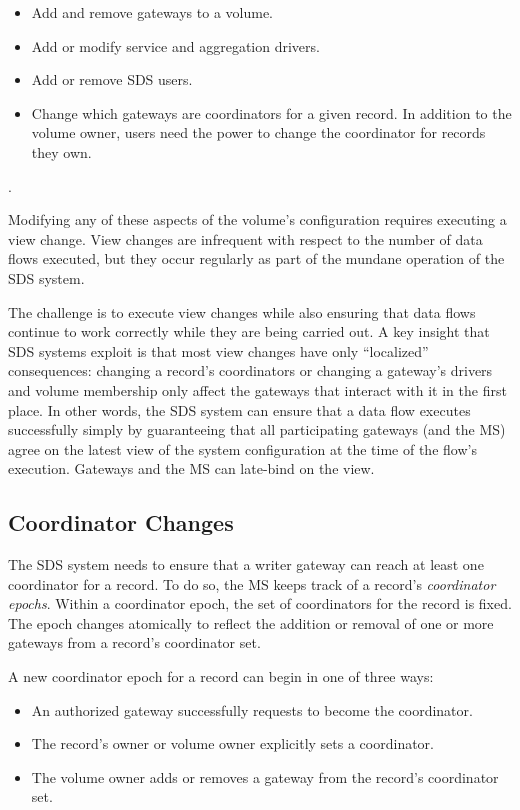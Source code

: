 \begin{itemize}
   \item Add and remove gateways to a volume.
   \item Add or modify service and aggregation drivers.
   \item Add or remove SDS users.
   \item Change which gateways are coordinators for a given record.  In addition
      to the volume owner, users need the power to change the coordinator for
      records they own.
\end{itemize}.

Modifying any of these aspects of the volume's configuration requires executing a
view change.  View changes are infrequent with respect to the number of data
flows executed, but they occur regularly as part of the mundane
operation of the SDS system.

The challenge is to execute view changes while also ensuring that data flows
continue to work correctly while they are being carried out.
A key insight that SDS systems exploit is that most view changes have only
``localized'' consequences:  changing a record's coordinators or changing
a gateway's drivers and volume membership only affect the gateways that interact
with it in the first place.  In other words, the SDS system can ensure that a
data flow executes successfully simply by guaranteeing that all participating
gateways (and the MS) agree on the latest view of the system configuration at the
time of the flow's execution.  Gateways and the MS can late-bind on the view.

\subsection{Coordinator Changes}

The SDS system needs to ensure that a writer gateway can reach at least one
coordinator for a record.  To do so, the MS keeps track of a record's
\emph{coordinator epochs}.  Within a coordinator epoch, the set of coordinators for the
record is fixed.  The epoch changes atomically to reflect the addition or removal of one
or more gateways from a record's coordinator set.

A new coordinator epoch for a record can begin in one of three ways:

\begin{itemize}
   \item An authorized gateway successfully requests to become the coordinator.
   \item The record's owner or volume owner explicitly sets a coordinator.
   \item The volume owner adds or removes a gateway from the record's coordinator
      set.
\end{itemize}

